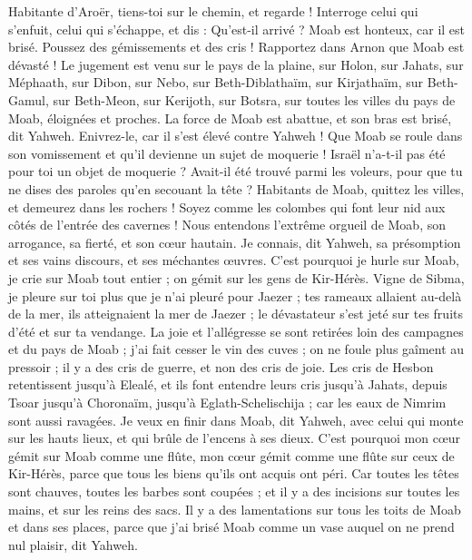 \begin{multicols}{2}
Habitante d'Aroër, tiens-toi sur le chemin, et regarde ! Interroge celui qui s'enfuit, celui qui s'échappe, et dis : Qu'est-il arrivé ?
Moab est honteux, car il est brisé. Poussez des gémissements et des cris ! Rapportez dans Arnon que Moab est dévasté !
Le jugement est venu sur le pays de la plaine, sur Holon, sur Jahats, sur Méphaath,
sur Dibon, sur Nebo, sur Beth-Diblathaïm,
sur Kirjathaïm, sur Beth-Gamul, sur Beth-Meon,
sur Kerijoth, sur Botsra, sur toutes les villes du pays de Moab, éloignées et proches.
La force de Moab est abattue, et son bras est brisé, dit Yahweh.
Enivrez-le, car il s'est élevé contre Yahweh ! Que Moab se roule dans son vomissement et qu'il devienne un sujet de moquerie !
Israël n'a-t-il pas été pour toi un objet de moquerie ? Avait-il été trouvé parmi les voleurs, pour que tu ne dises des paroles qu'en secouant la tête ?
Habitants de Moab, quittez les villes, et demeurez dans les rochers ! Soyez comme les colombes qui font leur nid aux côtés de l'entrée des cavernes !
Nous entendons l'extrême orgueil de Moab, son arrogance, sa fierté, et son cœur hautain.
Je connais, dit Yahweh, sa présomption et ses vains discours, et ses méchantes œuvres.
C'est pourquoi je hurle sur Moab, je crie sur Moab tout entier ; on gémit sur les gens de Kir-Hérès.
Vigne de Sibma, je pleure sur toi plus que je n'ai pleuré pour Jaezer ; tes rameaux allaient au-delà de la mer, ils atteignaient la mer de Jaezer ; le dévastateur s'est jeté sur tes fruits d'été et sur ta vendange.
La joie et l'allégresse se sont retirées loin des campagnes et du pays de Moab ; j'ai fait cesser le vin des cuves ; on ne foule plus gaîment au pressoir ; il y a des cris de guerre, et non des cris de joie.
Les cris de Hesbon retentissent jusqu'à Elealé, et ils font entendre leurs cris jusqu'à Jahats, depuis Tsoar jusqu'à Choronaïm, jusqu'à Eglath-Schelischija ; car les eaux de Nimrim sont aussi ravagées.
Je veux en finir dans Moab, dit Yahweh, avec celui qui monte sur les hauts lieux, et qui brûle de l'encens à ses dieux.
C'est pourquoi mon cœur gémit sur Moab comme une flûte, mon cœur gémit comme une flûte sur ceux de Kir-Hérès, parce que tous les biens qu'ils ont acquis ont péri.
Car toutes les têtes sont chauves, toutes les barbes sont coupées ; et il y a des incisions sur toutes les mains, et sur les reins des sacs.
Il y a des lamentations sur tous les toits de Moab et dans ses places, parce que j'ai brisé Moab comme un vase auquel on ne prend nul plaisir, dit Yahweh.

\end{multicols}
